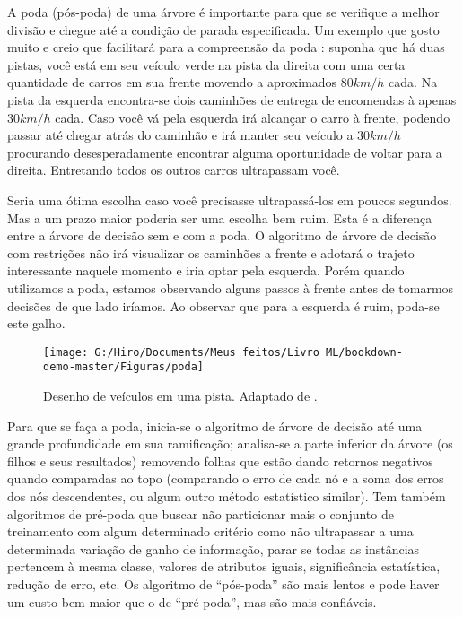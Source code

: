 \documentclass[
]{book}
\begin{document}
A poda (pós-poda) de uma árvore é importante para que se verifique a melhor divisão e chegue até a condição de parada especificada. Um exemplo que gosto muito e creio que facilitará para a compreensão da poda \citep{analytics} : suponha que há duas pistas, você está em seu veículo verde na pista da direita com uma certa quantidade de carros em sua frente movendo a aproximados 80\(km/h\) cada. Na pista da esquerda encontra-se dois caminhões de entrega de encomendas à apenas 30\(km/h\) cada. Caso você vá pela esquerda irá alcançar o carro à frente, podendo passar até chegar atrás do caminhão e irá manter seu veículo a 30\(km/h\) procurando desesperadamente encontrar alguma oportunidade de voltar para a direita. Entretando todos os outros carros ultrapassam você.

Seria uma ótima escolha caso você precisasse ultrapassá-los em poucos segundos. Mas a um prazo maior poderia ser uma escolha bem ruim. Esta é a diferença entre a árvore de decisão sem e com a poda. O algoritmo de árvore de decisão com restrições não irá visualizar os caminhões a frente e adotará o trajeto interessante naquele momento e iria optar pela esquerda. Porém quando utilizamos a poda, estamos observando alguns passos à frente antes de tomarmos decisões de que lado iríamos. Ao observar que para a esquerda é ruim, poda-se este galho.

\begin{figure}

{\centering \texttt{[image: G:/Hiro/Documents/Meus feitos/Livro ML/bookdown-demo-master/Figuras/poda]} 

}

\caption{Desenho de veículos em uma pista. Adaptado de \citep{analytics}.}\label{fig:poda}
\end{figure}



Para que se faça a poda, inicia-se o algoritmo de árvore de decisão até uma grande profundidade em sua ramificação; analisa-se a parte inferior da árvore (os filhos e seus resultados) removendo folhas que estão dando retornos negativos quando comparadas ao topo (comparando o erro de cada nó e a soma dos erros dos nós descendentes, ou algum outro método estatístico similar). Tem também algoritmos de pré-poda que buscar não particionar mais o conjunto de treinamento com algum determinado critério como não ultrapassar a uma determinada variação de ganho de informação, parar se todas as instâncias pertencem à mesma classe, valores de atributos iguais, significância estatística, redução de erro, etc. Os algoritmo de ``pós-poda'' são mais lentos e pode haver um custo bem maior que o de ``pré-poda'', mas são mais confiáveis.
\end{document}
